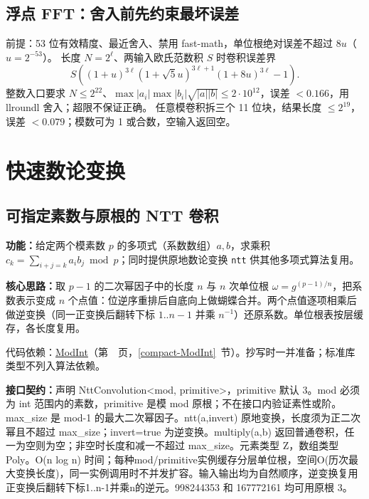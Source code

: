 

\subsection{浮点 FFT：舍入前先约束最坏误差}\label{knowledge-float-fft}
前提：53 位有效精度、最近舍入、禁用 fast-math，单位根绝对误差不超过 $8u$（$u=2^{-53}$）。
长度 $N=2^\ell$、两输入欧氏范数积 $S$ 时卷积误差界
\[
 S\left((1+u)^{3\ell}(1+\sqrt5u)^{3\ell+1}
 (1+8u)^{3\ell}-1\right).
\]
整数入口要求 $N\le2^{22}$、$\max|a_i|\max|b_i|\sqrt{|a||b|}\le2\cdot10^{12}$，误差 $<0.166$，用 llroundl 舍入；超限不保证正确。
任意模卷积拆三个 11 位块，结果长度 $\le2^{19}$，误差 $<0.079$；模数可为 1 或合数，空输入返回空。


\Needspace{628pt}

\section{快速数论变换}

\subsection{可指定素数与原根的 NTT 卷积}\label{compact-NttConvolution}

\noindent\textbf{功能：}\allowbreak 给定两个模素数 $p$ 的多项式（系数数组）$a,b$，求乘积 $c_k=\sum_{i+j=k}a_ib_j \bmod p$；同时提供原地数论变换 \texttt{ntt} 供其他多项式算法复用。

\textbf{核心思路：}\allowbreak 取 $p-1$ 的二次幂因子中的长度 $n$ 与 $n$ 次单位根 $\omega=g^{(p-1)/n}$，把系数表示变成 $n$ 个点值：位逆序重排后自底向上做蝴蝶合并。两个点值逐项相乘后做逆变换（同一正变换后翻转下标 $1..n-1$ 并乘 $n^{-1}$）还原系数。单位根表按层缓存，各长度复用。

代码依赖：\hyperref[compact-ModInt]{ModInt}（第~\pageref{compact-ModInt}~页，\ref{compact-ModInt}~节）。抄写时一并准备；标准库类型不列入算法依赖。

{\sloppy{}\noindent\textbf{接口契约：}声明 NttConvolution<mod, primitive>，primitive 默认 3。mod 必须为 int 范围内的素数，primitive 是模 mod 原根；不在接口内验证素性或阶。max\_size 是 mod-1 的最大二次幂因子。ntt(a,invert) 原地变换，长度须为正二次幂且不超过 max\_size；invert=true 为逆变换。multiply(a,b) 返回普通卷积，任一为空则为空；非空时长度和减一不超过 max\_size。元素类型 Z，数组类型 Poly。O(n log n) 时间；每种mod/primitive实例缓存分层单位根，空间O(历次最大变换长度)，同一实例调用时不并发扩容。输入输出均为自然顺序，逆变换复用正变换后翻转下标1..n-1并乘n的逆元。998244353 和 167772161 均可用原根 3。\par}

